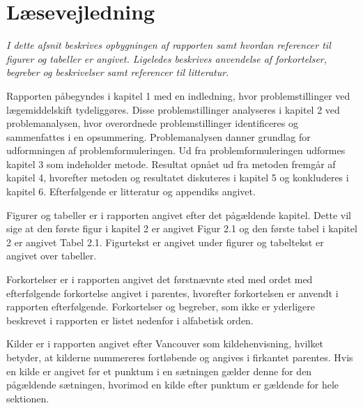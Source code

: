 \section*{Læsevejledning}
\textit{I dette afsnit beskrives opbygningen af rapporten samt hvordan referencer til figurer og tabeller er angivet. Ligeledes beskrives anvendelse af forkortelser, begreber og beskrivelser samt referencer til litteratur.}

Rapporten påbegyndes i kapitel 1 med en indledning, hvor problemstillinger ved lægemiddelskift tydeliggøres. Disse problemstillinger analyseres i kapitel 2 ved problemanalysen, hvor overordnede problemstillinger identificeres og sammenfattes i en opsummering. Problemanalysen danner grundlag for udformningen af problemformuleringen. Ud fra problemformuleringen udformes kapitel 3 som indeholder metode.  Resultat opnået ud fra metoden fremgår af kapitel 4, hvorefter metoden og resultatet diskuteres i kapitel 5 og konkluderes i kapitel 6. Efterfølgende er litteratur og appendiks angivet.

Figurer og tabeller er i rapporten angivet efter det pågældende kapitel. Dette vil sige at den første figur i kapitel 2 er angivet Figur 2.1 og den første tabel i kapitel 2 er angivet Tabel 2.1. Figurtekst er angivet under figurer og tabeltekst er angivet over tabeller. 

Forkortelser er i rapporten angivet det førstnævnte sted med ordet med efterfølgende forkortelse angivet i parentes, hvorefter forkortelsen er anvendt i rapporten efterfølgende. Forkortelser og begreber, som ikke er yderligere beskrevet i rapporten er listet nedenfor i alfabetisk orden.

Kilder er i rapporten angivet efter Vancouver som kildehenvisning, hvilket betyder, at kilderne nummereres fortløbende og angives i firkantet parentes. Hvis en kilde er angivet før et punktum i en sætningen gælder denne for den pågældende sætningen, hvorimod en kilde efter punktum er gældende for hele sektionen.

